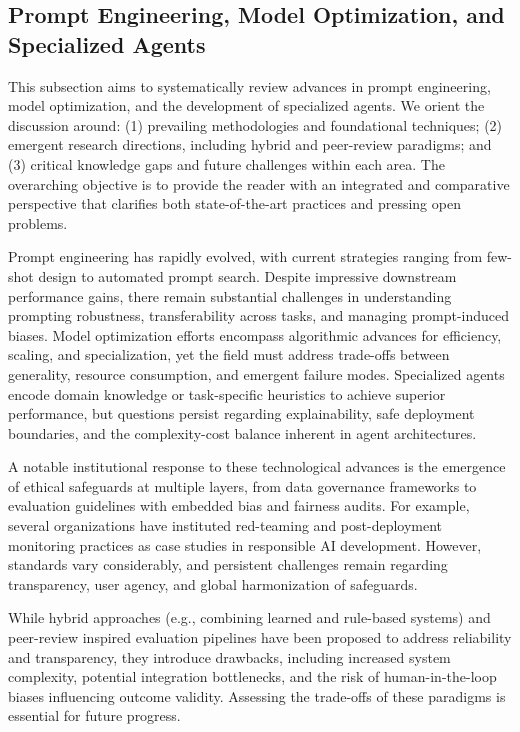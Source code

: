 \documentclass[sigconf]{acmart}
\begin{document}
\subsection{Prompt Engineering, Model Optimization, and Specialized Agents}
This subsection aims to systematically review advances in prompt engineering, model optimization, and the development of specialized agents. We orient the discussion around: (1) prevailing methodologies and foundational techniques; (2) emergent research directions, including hybrid and peer-review paradigms; and (3) critical knowledge gaps and future challenges within each area. The overarching objective is to provide the reader with an integrated and comparative perspective that clarifies both state-of-the-art practices and pressing open problems.

Prompt engineering has rapidly evolved, with current strategies ranging from few-shot design to automated prompt search. Despite impressive downstream performance gains, there remain substantial challenges in understanding prompting robustness, transferability across tasks, and managing prompt-induced biases. Model optimization efforts encompass algorithmic advances for efficiency, scaling, and specialization, yet the field must address trade-offs between generality, resource consumption, and emergent failure modes. Specialized agents encode domain knowledge or task-specific heuristics to achieve superior performance, but questions persist regarding explainability, safe deployment boundaries, and the complexity-cost balance inherent in agent architectures.

A notable institutional response to these technological advances is the emergence of ethical safeguards at multiple layers, from data governance frameworks to evaluation guidelines with embedded bias and fairness audits. For example, several organizations have instituted red-teaming and post-deployment monitoring practices as case studies in responsible AI development. However, standards vary considerably, and persistent challenges remain regarding transparency, user agency, and global harmonization of safeguards.

While hybrid approaches (e.g., combining learned and rule-based systems) and peer-review inspired evaluation pipelines have been proposed to address reliability and transparency, they introduce drawbacks, including increased system complexity, potential integration bottlenecks, and the risk of human-in-the-loop biases influencing outcome validity. Assessing the trade-offs of these paradigms is essential for future progress.
\end{document}
